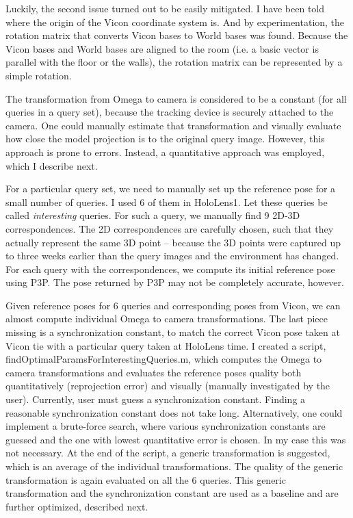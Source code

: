 \documentclass[twoside]{ctuthesis}
\theoremstyle{plain}
\theoremstyle{definition}
\theoremstyle{note}
\begin{document}
Luckily, the second issue turned out to be easily mitigated. I have been told where the origin of the Vicon coordinate system is. And by experimentation, the rotation matrix that converts Vicon bases to World bases was found. Because the Vicon bases and World bases are aligned to the room (i.e. a basic vector is parallel with the floor or the walls), the rotation matrix can be represented by a simple rotation.

The transformation from Omega to camera is considered to be a constant (for all queries in a query set), because the tracking device is securely attached to the camera. One could manually estimate that transformation and visually evaluate how close the model projection is to the original query image. However, this approach is prone to errors. Instead, a quantitative approach was employed, which I describe next.

For a particular query set, we need to manually set up the reference pose for a small number of queries. I used 6 of them in HoloLens1. Let these queries be called \emph{interesting} queries. For such a query, we manually find 9 2D-3D correspondences. The 2D correspondences are carefully chosen, such that they actually represent the same 3D point -- because the 3D points were captured up to three weeks earlier than the query images and the environment has changed. For each query with the correspondences, we compute its initial reference pose using P3P. The pose returned by P3P may not be completely accurate, however.

Given reference poses for 6 queries and corresponding poses from Vicon, we can almost compute individual Omega to camera transformations. The last piece missing is a synchronization constant, to match the correct Vicon pose taken at Vicon tie with a particular query taken at HoloLens time. I created a script, findOptimalParamsForInterestingQueries.m, which computes the Omega to camera transformations and evaluates the reference poses quality both quantitatively (reprojection error) and visually (manually investigated by the user). Currently, user must guess a synchronization constant. Finding a reasonable synchronization constant does not take long. Alternatively, one could implement a brute-force search, where various synchronization constants are guessed and the one with lowest quantitative error is chosen. In my case this was not necessary. At the end of the script, a generic transformation is suggested, which is an average of the individual transformations. The quality of the generic transformation is again evaluated on all the 6 queries. This generic transformation and the synchronization constant are used as a baseline and are further optimized, described next.
\end{document}
